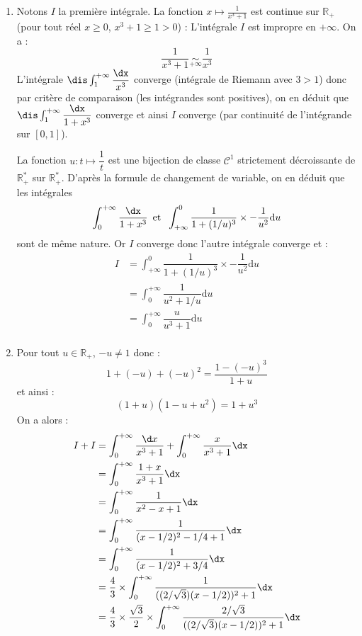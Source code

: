\documentclass[a4paper,10pt]{report}
\begin{document}
\begin{enumerate}
\item Notons $I$ la première intégrale. La fonction $x \mapsto \frac{1}{x^{3} + 1}$ est continue sur $\mathbb{R}_+$ (pour tout réel $x \geq 0$, $x^3+1 \geq 1>0$) : L'intégrale $I$ est impropre en $+ \infty$. On a :
$$  \frac{1}{x^{3} + 1} \underset{+ \infty}{\sim} \dfrac{1}{x^3} $$
L'intégrale $\dis \int_1^{+\infty} \dfrac{\dx}{x^3}$ converge (intégrale de Riemann avec $3>1$) donc par critère de comparaison (les intégrandes sont positives), on en déduit que $\dis \int_1^{+\infty} \dfrac{\dx}{1+x^3}$ converge et ainsi $I$ converge (par continuité de l'intégrande sur $[0,1]$). 

\medskip

\noindent La fonction $u : t \mapsto \dfrac{1}{t}$ est une bijection de classe $\mathcal{C}^1$ strictement décroissante de $\mathbb{R}_+^*$ sur $\mathbb{R}_+^*$. D'après la formule de changement de variable, on en déduit que les intégrales 
$$ \int_0^{+\infty} \dfrac{\dx}{1+x^3} \,\hbox{ et } \;\int_{+\infty}^{0} \dfrac{1}{1+(1/u)^3} \times - \dfrac{1}{u^2} \textrm{d}u$$
sont de même nature. Or $I$ converge donc l'autre intégrale converge et :
\begin{align*}
I & = \int_{+\infty}^{0} \dfrac{1}{1+(1/u)^3} \times - \dfrac{1}{u^2} \textrm{d}u  \\
& = \int_{0}^{+ \infty} \dfrac{1}{u^2+1/u} \textrm{d}u \\
& = \int_{0}^{+ \infty} \dfrac{u}{u^3+1} \textrm{d}u \\
\end{align*}
\item Pour tout $u \in \mathbb{R}_+$, $-u \neq 1$ donc :
$$ 1+ (-u)+ (-u)^2 = \dfrac{1-(-u)^3}{1+u}$$
et ainsi :
$$ (1+u)(1-u+u^2) = 1+u^3$$
On a alors :
\begin{align*}
I+I & = \int_{0}^{ + \infty} \frac{\d x}{x^{3} + 1} + \int_{0}^{ + \infty} \frac{x}{x^{3} + 1}\dx\\
& = \int_{0}^{ + \infty} \frac{1+x}{x^{3} + 1} \dx \\
& = \int_{0}^{ + \infty} \frac{1}{x^2-x+1} \dx \\
& = \int_{0}^{ + \infty} \frac{1}{(x-1/2)^2-1/4+1} \dx \\
& = \int_{0}^{ + \infty} \frac{1}{(x-1/2)^2+3/4} \dx \\
& = \dfrac{4}{3} \times  \int_{0}^{ + \infty} \frac{1}{((2/ \sqrt{3})(x-1/2))^2+1} \dx \\
& = \dfrac{4}{3} \times \dfrac{\sqrt{3}}{2} \times \int_{0}^{ + \infty} \frac{2/\sqrt{3}}{((2/ \sqrt{3})(x-1/2))^2+1} \dx \\

\end{align*}
\end{enumerate}
\end{document}

